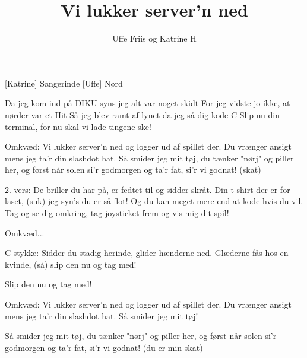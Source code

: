 \documentclass[a4paper,12pt]{article}
\title{Vi lukker server'n ned}
\author{Uffe Friis og Katrine H}
\begin{document}
\maketitle

\begin{roles}
[Katrine] Sangerinde
[Uffe] Nørd
\end{roles}

\begin{song}

   Da jeg kom ind på DIKU
  syns jeg alt var noget skidt
  For jeg vidste jo ikke,
  at nørder var et Hit
  Så jeg blev ramt af lynet
  da jeg så dig kode C
  Slip nu din terminal,
  for nu skal vi lade tingene ske!
  
  Omkvæd:
   Vi lukker server'n ned
  og logger ud af spillet der.
  Du vrænger ansigt mens
  jeg ta'r din slashdot hat.
  Så smider jeg mit tøj,
  du tænker "nørj" og piller her,
  og først når solen
  si'r godmorgen og ta'r fat,
  si'r vi godnat! (skat)
  
  2. vers:  
  De briller du har på,
  er fedtet til og sidder skråt.
  Din t-shirt der er for laset,
  (suk) jeg syn's du er så flot!
  Og du kan meget mere
  end at kode hvis du vil.
  Tag og se dig omkring,
  tag joysticket frem og vis mig dit spil!
  
  Omkvæd...
  
  C-stykke: 
  Sidder du stadig herinde,
  glider hænderne ned.
  Glæderne fås hos en kvinde,
  (så) slip den nu og tag med!
  
  
   Slip den nu og tag med!
  
  Omkvæd:   
  Vi lukker server'n ned
  og logger ud af spillet der.
  Du vrænger ansigt mens
  jeg ta'r din slashdot hat.
  Så smider jeg mit tøj!
  
  
   Så smider jeg mit tøj,
  du tænker "nørj" og piller her,
  og først når solen
  si'r godmorgen og ta'r fat,
  si'r vi godnat! (du er min skat)
  
\end{song}
\end{document}
